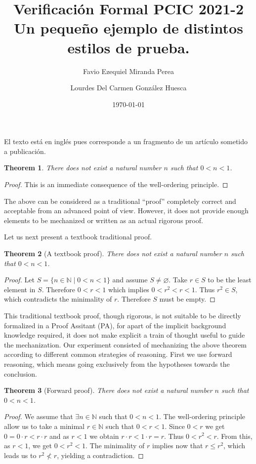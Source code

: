\documentclass[11pt,letterpaper]{article}
\title{Verificaci\'on Formal PCIC 2021-2 \\
Un pequeño ejemplo de distintos estilos de prueba.
}
\author{Favio Ezequiel Miranda Perea \and %
Lourdes Del Carmen Gonz\'alez Huesca}  %
\date{\today}
\newtheorem{theorem}{Theorem}
\begin{document}
\maketitle
El texto está en inglés pues corresponde a un fragmento de un artículo sometido a publicación.

\begin{theorem}\label{thm:nn01v0}
  There does not exist a natural number $n$ such that $0<n<1$.
\end{theorem}
\begin{proof}
This is an immediate consequence of the well-ordering principle.
\end{proof}

The above can be considered as a traditional ``proof'' completely correct and 
acceptable from an advanced point of view. However, it does not provide enough 
elements to be mechanized or written as an actual rigorous proof.

Let us next present a textbook traditional proof.

\begin{theorem}[A textbook proof]\label{thm:nn01v1}
  There does not exist a natural number $n$ such that $0<n<1$.
\end{theorem}
\begin{proof}
 Let $S=\{n\in\mathbb{N}\mid 0<n<1\}$ and assume $S\neq\varnothing$. Take
 $r\in S$ to be the least element in $S$. Therefore $0<r<1$ which implies
 $0<r^2<r<1$. Thus $r^2\in S$, which contradicts the minimality of
 $r$. Therefore $S$ must be empty.
\end{proof}

This traditional textbook proof, though rigorous, is not suitable to be 
directly formalized in a Proof Assitant (PA), for apart of the implicit background knowledge 
required, it does not make explicit a train of thought useful to guide 
the mechanization. Our experiment consisted of mechanizing the above theorem 
according to different common strategies of reasoning. First we use forward 
reasoning, which means going exclusively from the hypotheses towards the 
conclusion.

\begin{theorem}[Forward proof]\label{thm:nn01vf}
  There does not exist a natural number $n$ such that $0<n<1$.
\end{theorem}
\begin{proof}
  We assume that $\exists n\in\mathbb{N}$ such that $0<n<1$.
  The well-ordering principle allow us to take a minimal $r\in\mathbb{N}$ such 
  that $0<r<1$. Since $0<r$ we get $0=0\cdot r< r\cdot r$ and
 as $r<1$ we obtain $r\cdot r<1\cdot r = r$. Thus $0<r^2<r$. From this, as
 $r<1$, we get $0<r^2<1$. The minimality of $r$
 implies now that $r\leq r^2$, which leads us to $r^2\not <r$, yielding a 
contradiction.
\end{proof}
\end{document}
